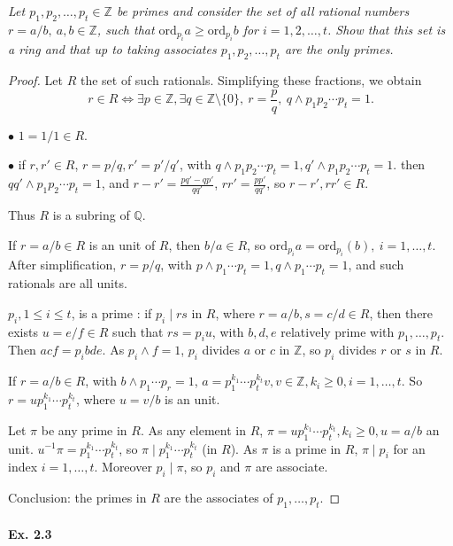 \documentclass[11pt,a4paper]{article}
\newcommand{\Q}{\mathbb{Q}}
\newcommand{\Z}{\mathbb{Z}}
\newcommand{\ord}{\mathrm{ord}}
\begin{document}
{{\it Let $p_1,p_2,\ldots,p_t \in \Z$ be primes and consider the set of all rational numbers $r = a/b,\ a,b\in \Z$, such that $\ord_{p_i} a\geq \ord_{p_i}b$ for $i=1,2,\ldots,t$. Show that this set is a ring and that up to taking associates $p_1,p_2,\ldots,p_t$ are the only primes.
}

\begin{proof}
Let $R$ the set of such rationals. Simplifying these fractions, we obtain
$$r \in R \iff \exists p \in \Z, \exists q \in \Z\setminus\{0\}, \ r = \frac{p}{q}, \ q \wedge p_1p_2\cdots p_t = 1.$$

$\bullet$ $1 = 1/1  \in R$.

$\bullet$ if $r,r' \in R$, $r = p/q, r' = p'/q'$, with $q \wedge p_1p_2\cdots p_t=1, q' \wedge p_1p_2\cdots p_t=1$. then $qq'\wedge p_1p_2\cdots p_t = 1$, and $r-r' = \frac{pq'-qp'}{qq'}$, $rr' = \frac{pp'}{qq'}$, so $r-r', rr' \in R$.

Thus $R$ is a subring of $\Q$.

If $r=a/b \in R$ is an unit of $R$, then $b/a \in R$, so $\ord_{p_i}a = \ord_{p_i}(b), \ i= 1,\ldots,t$. After simplification, $r = p/q$, with $p \wedge p_1\cdots p_t=1, q \wedge p_1\cdots p_t = 1$, and such rationals are all units.

$p_i, 1\leq i \leq t$, is a prime : if $p_i \mid rs$ in $R$, where $r=a/b,s = c/d \in R$, then there exists $u = e/f \in R$ such that $rs = p_i u$, with $b,d,e$ relatively prime with $p_1,\ldots,p_t$. Then $ac f= p_i bde$. As $p_i\wedge f=1$, $p_i$ divides $a$ or $c$ in $\Z$, so $p_i$ divides $r$ or $s$ in $R$.

If $r = a/b \in R$, with $b\wedge p_1\cdots p_r=1$, $a  = p_1^{k_1}\cdots p_t^{k_t} v, v \in \Z, k_i\geq 0, i=1,\ldots,t$. So $r = u p_1^{k_1}\cdots p_t^{k_t} $, where $u = v/b$ is an unit.

Let $\pi$ be any prime in $R$. As any element in $R$, $\pi = u p_1^{k_1}\cdots p_t^{k_t}, k_i\geq 0, u = a/b$ an unit. $u^{-1} \pi = p_1^{k_1}\cdots p_t^{k_t}$, so $\pi \mid p_1^{k_1}\cdots p_t^{k_t}$ (in $R$). As $\pi$ is a prime in $R$, $\pi \mid p_i$ for an index $i=1,\ldots,t$. Moreover $p_i \mid \pi$, so $p_i$ and $\pi$ are associate.

Conclusion: the primes in $R$ are the associates of $p_1,\ldots,p_t$.
\end{proof}

\paragraph{Ex. 2.3}

}
\end{document}
